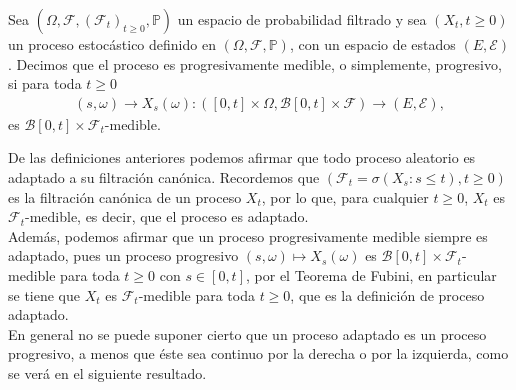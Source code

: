 \begin{definition}
	Sea $(\Omega, \mathcal{F}, (\mathcal{F}_t)_{t \geq 0}, \mathbb{P})$ un espacio de probabilidad filtrado y sea $(X_t, t \geq 0)$ un proceso estocástico definido en $(\Omega, \mathcal{F}, \mathbb{P})$, con un espacio de estados $(E, \mathcal{E})$. Decimos que el proceso es progresivamente medible, o simplemente, progresivo, si para toda $t \geq 0$
	\begin{align*}
		(s, \omega) \rightarrow X_s (\omega) : ([0, t] \times \Omega, \mathcal{B}[0, t] \times \mathcal{F}) \rightarrow (E, \mathcal{E}),
	\end{align*}
es $\mathcal{B}[0, t] \times \mathcal{F}_t$-medible.
\end{definition}

De las definiciones anteriores podemos afirmar que todo proceso aleatorio es adaptado a su filtración canónica. Recordemos que $(\mathcal{F}_t = \sigma( X_s : s \leq t ), t \geq 0)$ es la filtración canónica de un proceso $X_t$, por lo que, para cualquier $t \geq 0$, $X_t$ es $\mathcal{F}_t$-medible, es decir, que el proceso es adaptado. \\ 

Además, podemos afirmar que un proceso progresivamente medible siempre es adaptado, pues un proceso progresivo $(s, \omega) \mapsto X_s(\omega)$ es $\mathcal{B}[0, t] \times \mathcal{F}_t$-medible para toda $t \geq 0$ con $s \in [0, t]$, por el Teorema de Fubini, en particular se tiene que $X_t$ es $\mathcal{F}_t$-medible para toda $t \geq 0$, que es la definición de proceso adaptado. \\

En general no se puede suponer cierto que un proceso adaptado es un proceso progresivo, a menos que éste sea continuo por la derecha o por la izquierda, como se verá en el siguiente resultado.

